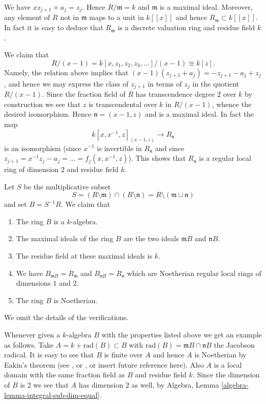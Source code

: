 \medskip\noindent
We have $xz_{j + 1} + a_j = z_j$. Hence $R/\mathfrak m = k$
and $\mathfrak m$ is a maximal ideal. Moreover, any element of $R$
not in $\mathfrak m$ maps to a unit in $k[[x]]$ and hence
$R_{\mathfrak m} \subset k[[x]]$. In fact it is easy to deduce
that $R_{\mathfrak m}$ is a discrete valuation ring and residue
field $k$.

\medskip\noindent
We claim that
$$
R/(x - 1) =
k[x, z_1, z_2, z_3, \ldots ]/(x - 1)
\cong
k[z].
$$
Namely, the relation above implies that
$(x - 1)(z_{j + 1} + a_j) = -z_{j + 1} - a_j + z_j$, and hence
we may express the class of $z_{j + 1}$ in terms of $z_j$ in
the quotient $R/(x - 1)$. Since the fraction field of $R$
has transcendence degree $2$ over $k$ by construction we see that $z$ is
transcendental over $k$ in $R/(x - 1)$, whence the desired isomorphism.
Hence $\mathfrak n = (x - 1, z)$ and is a maximal ideal. In fact the
map
$$
k[x, x^{-1}, z]_{(x - 1, z)} \longrightarrow R_{\mathfrak n}
$$
is an isomorphism (since $x^{-1}$ is invertible in $R_{\mathfrak n}$
and since $z_{j + 1} = x^{-1}z_j - a_j = \ldots = f_j(x, x^{-1}, z)$).
This shows that $R_{\mathfrak n}$ is a regular local ring
of dimension $2$ and residue field $k$.

\medskip\noindent
Let $S$ be the multiplicative subset
$$
S =
(R \setminus \mathfrak m) \cap (R \setminus \mathfrak n) =
R \setminus (\mathfrak m \cup \mathfrak n)
$$
and set $B = S^{-1}R$. We claim that
\begin{enumerate}
\item The ring $B$ is a $k$-algebra.
\item The maximal ideals of the ring $B$ are the two ideals
$\mathfrak mB$ and $\mathfrak nB$.
\item The residue field at these maximal ideals is $k$.
\item We have $B_{\mathfrak mB} = R_{\mathfrak m}$
and $B_{\mathfrak nB} = R_{\mathfrak n}$
which are Noetherian regular local rings of dimensions $1$ and $2$.
\item The ring $B$ is Noetherian.
\end{enumerate}
We omit the details of the verifications.

\medskip\noindent
Whenever given a $k$-algebra $B$ with the properties listed above we
get an example as follows. Take $A = k + \text{rad}(B) \subset B$
with $\text{rad}(B) = \mathfrak mB \cap \mathfrak nB$ the Jacobson radical.
It is easy to see that $B$ is finite over $A$ and hence $A$ is
Noetherian by Eakin's theorem (see \cite{Eakin}, or
\cite[Appendix A1]{Nagata}, or insert future reference here).
Also $A$ is a local domain with the same fraction field as $B$ and
residue field $k$. Since the dimension of $B$ is $2$ we see that $A$
has dimension $2$ as well, by
Algebra, Lemma \ref{algebra-lemma-integral-sub-dim-equal}.

